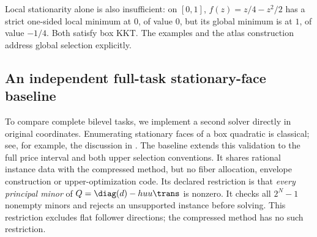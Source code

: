 Local stationarity alone is also insufficient: on $[0,1]$,
$f(z)=z/4-z^2/2$ has a strict one-sided local minimum at $0$, of value $0$,
but its global minimum is at $1$, of value $-1/4$. Both satisfy box KKT.
The examples and the atlas construction address global selection explicitly.

\subsection{An independent full-task stationary-face baseline}
\label{subsec:full-task-baseline}
To compare complete bilevel tasks, we implement a second solver directly in
original coordinates. Enumerating stationary faces of a box quadratic is
classical; see, for example, the discussion in \cite{HladikCernyRada2021}.
The baseline extends this validation to the full price interval and both upper
selection conventions. It shares rational instance data with the compressed
method, but no fiber allocation, envelope construction or upper-optimization
code. Its declared restriction is that \emph{every principal minor} of
$Q=\diag(d)-huu\trans$ is nonzero. It checks all $2^N-1$ nonempty minors
and rejects an unsupported instance before solving. This restriction excludes
flat follower directions; the compressed method has no such restriction.

